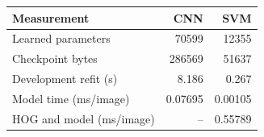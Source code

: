 \begin{center}\begin{tabular}{lrr}
\toprule
Measurement & CNN & SVM \\\midrule
Learned parameters & 70599 & 12355 \\
Checkpoint bytes & 286569 & 51637 \\
Development refit (s) & 8.186 & 0.267 \\
Model time (ms/image) & 0.07695 & 0.00105 \\
HOG and model (ms/image) & -- & 0.55789 \\
\bottomrule\end{tabular}\end{center}
